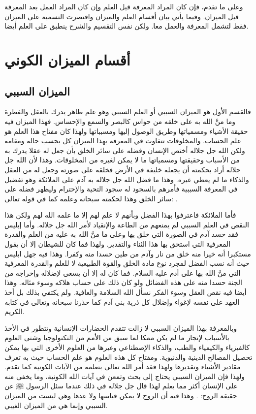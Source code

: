 وعلى ما تقدم، فإن كان المراد المعرفة قيل العلم وإن كان المراد العمل بعد المعرفة قيل الميزان. وفيما يأتي بيان أقسام العلم والميزان واقتصرت التسمية على الميزان فقط لتشمل المعرفة والعمل معا. ولكن نفس التقسيم والشرح ينطبق على العلم أيضا.

\section{أقسام الميزان الكوني}

\subsection{الميزان السببي}

فالقسم الأول هو الميزان السببي أو العلم السببي وهو علم ظاهر يدرك بالعقل والفطرة وما منَّ الله به على خلقه من حواس كالبصر والسمع والإحساس. فهذا الميزان فيه حقيقة الأشياء ومسمياتها وطريق الوصول إليها ومسبباتها ولهذا كان مفتاح هذا العلم هو علم الحساب. والمخلوقات تتفاوت في المعرفة بهذا الميزان كل بحسب حاله ومقامه ولكن الله جل جلاله أختص الإنسان وفضله على سائر الخلق بأن جعل له عقلا يدرك به من الأسباب وحقيقتها ومسمياتها ما لا يمكن لغيره من المخلوقات. وهذا لأن الله جل جلاله أراد بحكمته أن يجعله خليفة في الأرض فخلقه على صورته وجعل له من العقل والذكاء ما لم يعطي غيره. وهذا ما فضل الله جل جلاله به آدم على الملائكة وهو تفضيل في المعرفة السببية فأمرهم بالسجود له سجود التحية والإحترام وليظهر فضله على سائر الخلق وهذا لحكمته سبحانه وعلمه كما في قوله تعالى:
\quranayah*[2][30-34]{\footnotesize \surahname*[2]}.

فأما الملائكة فاعترفوا بهذا الفضل وبأنهم لا علم لهم إلا ما علمه الله لهم ولكن هذا النقص في العلم السببي لم يمنعهم من الطاعة والإنقياد لأمر الله جل جلاله. وأما إبليس فقد حسد آدم في الصورة التي خلق بها وعلى ما منَّ الله به عليه من العلم والقدرة المعرفية التي استحق بها هذا الثناء والتقدير. ولهذا فما كان للشيطان إلا أن يقول مستكبرا أنه خيرا منه خلق من نار وآدم من طين حسدا منه وكفرا. وهذا فيه جهل ابليس حيث أنه نسب الفضل لمجرد نوع مادة الخلق والقوة الطبيعية لا للعلم والقدرة المعرفية التي منَّ الله بها على آدم عليه السلام. فما كان له إلا أن يسعى لإضلاله وإخراجه من الجنة حسدا منه على هذه الفضائل ولو كان ذلك على حساب هلاكه وسوء مئاله. وهذا أيضا فيه نقص العقل وسوء الفكر نسأل الله السلامة والعافية. ولم يكتفي بذلك بل أخذ العهد على نفسه لإغواء وإضلال كل ذرية بني آدم كما حذرنا سبحانه وتعالى في كتابه الكريم.

وبالمعرفة بهذا الميزان السببي لا زالت تتقدم الحضارات الإنسانية وتتطور في الأخذ بالأسباب لإنجاز ما لم يكن ممكا لما سبق من الأمم من التكنولوجيا وشتى العلوم كالفيزياء والكيمياء والطب، والذكاء الإصطناعي وغيرها من العلوم الأخرى التي بها يمكن تحصيل المصالح الدينية والدنيوية. ومفتاح كل هذه العلوم هو علم الحساب حيث به تعرف مقادير الأشياء وتقديرها ولهذا فقد أمر الله تعالى بتعلمه من الآيات الكونية كما تقدم. ولهذا فإن الميزان السببي يحتاج إلى بحث وتمعن في آيات الله الكونية، وما يخفى منه على الإنسان أكثر مما يعلم لهذا قال جل جلاله في ذلك عندما سئل الرسول ﷺ عن حقيقة الروح: 
\quranayah*[17][85]{\footnotesize \surahname*[17]}. وهذا فيه أن الروح لا يمكن قياسها ولا عدها وهي ليست من الميزان السببي وإنما هي من الميزان الغيبي. 

